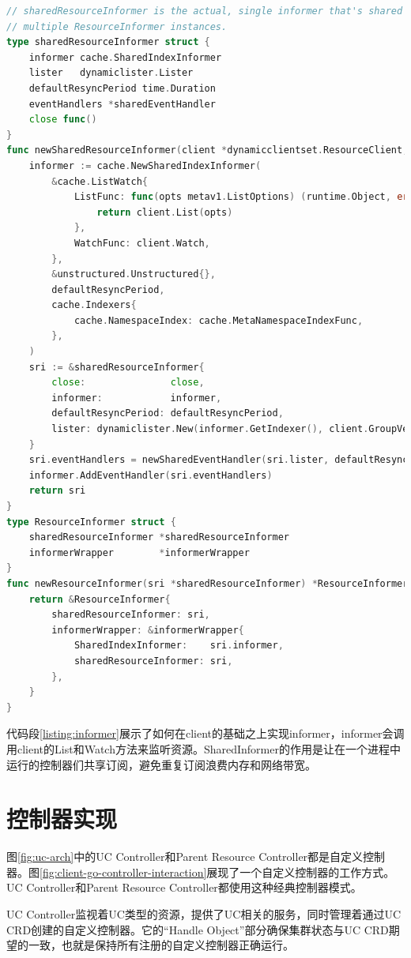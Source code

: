 \documentclass[macfonts,master]{njuthesis}
\begin{document}
\begin{lstlisting}[language=Go,caption=通知器（Informer）实现,label=listing:informer]
// sharedResourceInformer is the actual, single informer that's shared by
// multiple ResourceInformer instances.
type sharedResourceInformer struct {
	informer cache.SharedIndexInformer
	lister   dynamiclister.Lister
	defaultResyncPeriod time.Duration
	eventHandlers *sharedEventHandler
	close func()
}
func newSharedResourceInformer(client *dynamicclientset.ResourceClient, defaultResyncPeriod time.Duration, close func()) *sharedResourceInformer {
	informer := cache.NewSharedIndexInformer(
		&cache.ListWatch{
			ListFunc: func(opts metav1.ListOptions) (runtime.Object, error) {
				return client.List(opts)
			},
			WatchFunc: client.Watch,
		},
		&unstructured.Unstructured{},
		defaultResyncPeriod,
		cache.Indexers{
			cache.NamespaceIndex: cache.MetaNamespaceIndexFunc,
		},
	)
	sri := &sharedResourceInformer{
		close:               close,
		informer:            informer,
		defaultResyncPeriod: defaultResyncPeriod,
		lister: dynamiclister.New(informer.GetIndexer(), client.GroupVersionResource()),
	}
	sri.eventHandlers = newSharedEventHandler(sri.lister, defaultResyncPeriod)
	informer.AddEventHandler(sri.eventHandlers)
	return sri
}
type ResourceInformer struct {
	sharedResourceInformer *sharedResourceInformer
	informerWrapper        *informerWrapper
}
func newResourceInformer(sri *sharedResourceInformer) *ResourceInformer {
	return &ResourceInformer{
		sharedResourceInformer: sri,
		informerWrapper: &informerWrapper{
			SharedIndexInformer:    sri.informer,
			sharedResourceInformer: sri,
		},
	}
}
\end{lstlisting}

代码段\ref{listing:informer}展示了如何在client的基础之上实现informer，informer会调用client的List和Watch方法来监听资源。SharedInformer的作用是让在一个进程中运行的控制器们共享订阅，避免重复订阅浪费内存和网络带宽。

\section{控制器实现}

图\ref{fig:uc-arch}中的UC Controller和Parent Resource Controller都是自定义控制器。图\ref{fig:client-go-controller-interaction}展现了一个自定义控制器的工作方式。UC Controller和Parent Resource Controller都使用这种经典控制器模式。

UC Controller监视着UC类型的资源，提供了UC相关的服务，同时管理着通过UC CRD创建的自定义控制器。它的``Handle Object''部分确保集群状态与UC CRD期望的一致，也就是保持所有注册的自定义控制器正确运行。
\end{document}
